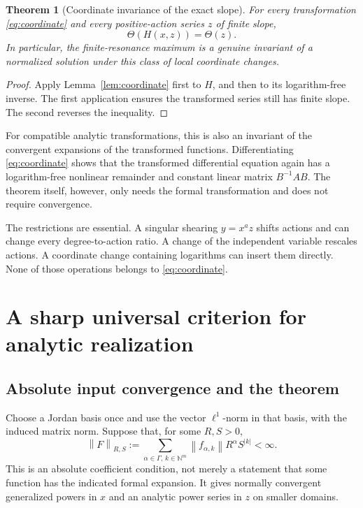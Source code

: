\documentclass[11pt,a4paper]{article}
\numberwithin{equation}{section}
\newtheorem{theorem}{Theorem}[section]
\theoremstyle{definition}
\theoremstyle{remark}
\newcommand{\NN}{\mathbb N}
\newcommand{\G}{\Gamma}
\newcommand{\norm}[1]{\left\lVert #1\right\rVert}
\begin{document}
\begin{theorem}[Coordinate invariance of the exact slope]
\label{thm:invariant}
For every transformation \eqref{eq:coordinate} and every
positive-action series \(z\) of finite slope,
\begin{equation}\label{eq:invariance}
 \boxed{\Theta(H(x,z))=\Theta(z).}
\end{equation}
In particular, the finite-resonance maximum is a genuine invariant of
a normalized solution under this class of local coordinate changes.
\end{theorem}
\begin{proof}
Apply Lemma~\ref{lem:coordinate} first to \(H\), and then to its
logarithm-free inverse. The first application ensures the transformed
series still has finite slope. The second reverses the inequality.
\end{proof}

For compatible analytic transformations, this is also an invariant of
the convergent expansions of the transformed functions. Differentiating
\eqref{eq:coordinate} shows that the transformed differential equation
again has a logarithm-free nonlinear remainder and constant linear
matrix \(B^{-1}AB\). The theorem itself, however, only needs the formal
transformation and does not require convergence.

The restrictions are essential. A singular shearing
\(y=x^az\) shifts actions and can change every degree-to-action ratio.
A change of the independent variable rescales actions. A coordinate
change containing logarithms can insert them directly. None of those
operations belongs to \eqref{eq:coordinate}.

\section{A sharp universal criterion for analytic realization}
\label{sec:analytic}

\subsection{Absolute input convergence and the theorem}
Choose a Jordan basis once and use the vector \(\ell^1\)-norm in that
basis, with the induced matrix norm. Suppose that, for some \(R,S>0\),
\begin{equation}\label{eq:input-norm}
 \norm{F}_{R,S}:=
 \sum_{\alpha\in\G,\,k\in\NN^m}
       \norm{f_{\alpha,k}}R^\alpha S^{|k|}<\infty.
\end{equation}
This is an absolute coefficient condition, not merely a statement that
some function has the indicated formal expansion. It gives normally
convergent generalized powers in \(x\) and an analytic power series in
\(z\) on smaller domains.
\end{document}
